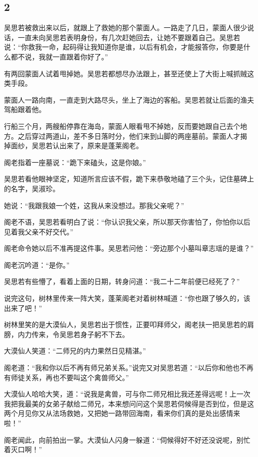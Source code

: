 {\centering\subsection{2}}

吴思若被救出来以后，就跟上了救她的那个蒙面人。一路走了几日，蒙面人很少说话，一直未向吴思若表明身份，有几次赶她回去，让她不要跟着自己。吴思若说：“你救我一命，起码得让我知道你是谁，以后有机会，才能报答你，你要是什么都不说，我就一直跟着你好了。”

有两回蒙面人试着甩掉她。吴思若都想尽办法跟上，甚至还使上了大街上喊抓贼这类手段。

蒙面人一路向南，一直走到大路尽头，坐上了海边的客船。吴思若就让后面的渔夫驾船跟着他。

行船三个月，两艘船停靠在海岛，蒙面人眼看甩不掉她，反而要她跟自己去个地方。之后穿过两道山，差不多日落时分，他们来到山脚的两座墓前。蒙面人才揭
掉面纱，吴思若认出来了，原来是蓬莱阁老。

阁老指着一座墓说：“跪下来磕头，这是你娘。”

吴思若看他眼神坚定，知道所言应该不假，跪下来恭敬地磕了三个头，记住墓碑上的名字，吴淑珍。

她说：“我跟我娘一个姓，这我从来没想过。那我父亲呢？”

阁老不语，吴思若看明白了说：“你认识我父亲，所以那天你害怕了，你怕你以后见着我父亲不好交代。”

阁老命令她以后不准再提这件事。吴思若问他：“旁边那个小墓叫章志瑶的是谁？”

阁老沉吟道：“是你。”

吴思若有些懵了，看着上面的日期，转身问道：“我二十二年前便已经死了？”

说完这句，树林里传来一阵大笑，蓬莱阁老对着树林喊道：“你也跟了够久的，该出来了吧！”

树林里笑的是大漠仙人，吴思若出于惯性，正要叩拜师父，阁老扶一把吴思若的肩膀，内力传来，令吴思若身子躬不下去。

大漠仙人笑道：“二师兄的内力果然日见精湛。”

阁老道：“我和你以后不再有师兄弟关系。”说完又对吴思若道：“以后你和他也不再有师徒关系，再也不要叫这个禽兽师父。”

大漠仙人哈哈大笑，道：“说我是禽兽，可与你二师兄相比我还差得远呢！上一次我把我最美的女弟子献给二师兄，本来想问问这个吴思若伺候得是否到位，但是这两个月见你又从法场救她，又把她一路带回海南，看来你们真的是处出感情来啦！”

阁老闻此，向前拍出一掌。大漠仙人闪身一躲道：“伺候得好不好还没说呢，别忙着灭口啊！”

